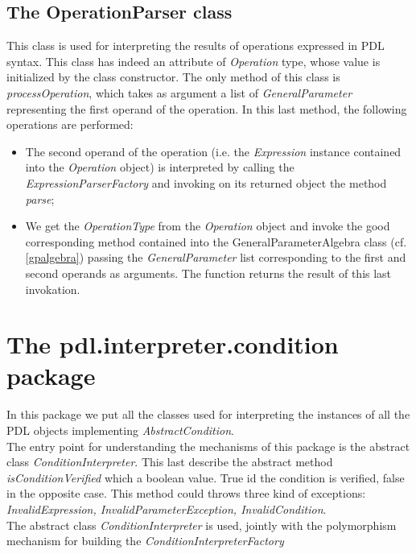 \documentclass[a4paper,11pt] {ivoa}
\begin{document}
\subsection{The OperationParser class}\label{operationParser}
This class is used for interpreting the results of operations expressed in PDL syntax. 
This class has indeed an attribute of {\it Operation} type, whose value is initialized by the class constructor. The only method of this class is {\it processOperation}, which takes as argument a list of {\it GeneralParameter} representing the first operand of the operation. In this last method, the following operations are performed:
\begin{itemize}
\item The second operand of the operation (i.e. the {\it Expression} instance contained into the {\it Operation} object) is interpreted by calling the {\it ExpressionParserFactory} and invoking on its returned object the method {\it parse};
\item We get the {\it OperationType} from the  {\it Operation} object and invoke the good corresponding method contained into the {GeneralParameterAlgebra} class (cf. \ref{gpalgebra})  passing the {\it GeneralParameter} list corresponding to the first and second operands as arguments. The function returns the result of this last invokation.
\end{itemize}

\section{The pdl.interpreter.condition package}\label{conditionInterpreters}
In this package we put all the classes used for interpreting the instances of all the PDL objects implementing {\it AbstractCondition}.\\
The entry point for understanding the mechanisms of this package is the abstract class {\it ConditionInterpreter}. This last describe the abstract method
{\it isConditionVerified}  which a boolean value. True id the condition is verified, false in the opposite case. This method could throws three kind of exceptions: {\it InvalidExpression,  InvalidParameterException, InvalidCondition}.\\
The abstract class {\it ConditionInterpreter} is used, jointly with the polymorphism mechanism for building the {\it ConditionInterpreterFactory}
\end{document}
